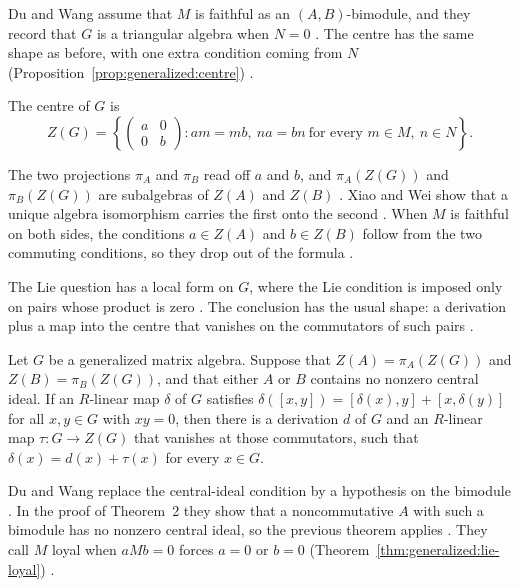Du and Wang assume that $M$ is faithful as an $(A,B)$-bimodule, and they record
that $G$ is a triangular algebra when $N=0$ \cite[p.~2720]{DuWang2012}. The centre
has the same shape as before, with one extra condition coming from $N$ (Proposition~\ref{prop:generalized:centre})
\cite[p.~2185]{XiaoWei2010}.\begin{proposition}\label{prop:generalized:centre}
The centre of $G$ is
\[
Z(G)=\left\{\begin{pmatrix} a & 0\\ 0 & b\end{pmatrix}:
am=mb,\ na=bn\ \text{for every } m\in M,\ n\in N\right\}.
\]
\end{proposition}

The two projections $\pi_A$ and $\pi_B$ read off $a$ and $b$, and
$\pi_A(Z(G))$ and $\pi_B(Z(G))$ are subalgebras of $Z(A)$ and $Z(B)$
\cite[p.~2185]{XiaoWei2010}. Xiao and Wei show that a unique algebra
isomorphism carries the first onto the second \cite[Lemma~3.2,
p.~2185]{XiaoWei2010}. When $M$ is faithful on both sides, the conditions
$a\in Z(A)$ and $b\in Z(B)$ follow from the two commuting conditions, so they
drop out of the formula \cite[p.~2185]{XiaoWei2010}.

The Lie question has a local form on $G$, where the Lie condition is imposed
only on pairs whose product is zero \cite[Theorem~1,
pp.~2720--2721]{DuWang2012}. The conclusion has the usual shape: a derivation
plus a map into the centre that vanishes on the commutators of such pairs
\cite[p.~2721]{DuWang2012}.

\begin{theorem}\label{thm:generalized:lie-local}
Let $G$ be a generalized matrix algebra. Suppose that $Z(A)=\pi_A(Z(G))$ and
$Z(B)=\pi_B(Z(G))$, and that either $A$ or $B$ contains no nonzero central ideal.
If an $R$-linear map $\delta$ of $G$ satisfies
$\delta([x,y])=[\delta(x),y]+[x,\delta(y)]$ for all $x,y\in G$ with $xy=0$, then
there is a derivation $d$ of $G$ and an $R$-linear map
$\tau\colon G\to Z(G)$ that vanishes at those commutators, such that
$\delta(x)=d(x)+\tau(x)$ for every $x\in G$.
\end{theorem}

Du and Wang replace the central-ideal condition by a hypothesis on the
bimodule \cite[p.~2725]{DuWang2012}. In the proof of Theorem~2 they show that
a noncommutative $A$ with such a bimodule has no nonzero central ideal, so the
previous theorem applies \cite[p.~2725]{DuWang2012}. They call $M$ loyal when
$aMb=0$ forces $a=0$ or $b=0$ (Theorem~\ref{thm:generalized:lie-loyal})
\cite[p.~2725]{DuWang2012}.

